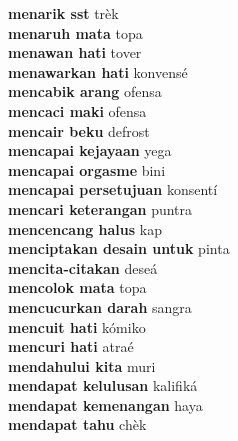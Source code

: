 \textbf{ menarik sst  } trèk \\
\textbf{ menaruh mata  } topa \\
\textbf{ menawan hati  } tover \\
\textbf{ menawarkan hati  } konvensé \\
\textbf{ mencabik arang  } ofensa \\
\textbf{ mencaci maki  } ofensa \\
\textbf{ mencair beku  } defrost \\
\textbf{ mencapai kejayaan  } yega \\
\textbf{ mencapai orgasme  } bini \\
\textbf{ mencapai persetujuan  } konsentí \\
\textbf{ mencari keterangan  } puntra \\
\textbf{ mencencang halus  } kap \\
\textbf{ menciptakan desain untuk  } pinta \\
\textbf{ mencita-citakan  } deseá \\
\textbf{ mencolok mata  } topa \\
\textbf{ mencucurkan darah  } sangra \\
\textbf{ mencuit hati  } kómiko \\
\textbf{ mencuri hati  } atraé \\
\textbf{ mendahului kita  } muri \\
\textbf{ mendapat kelulusan  } kalifiká \\
\textbf{ mendapat kemenangan  } haya \\
\textbf{ mendapat tahu  } chèk \\
